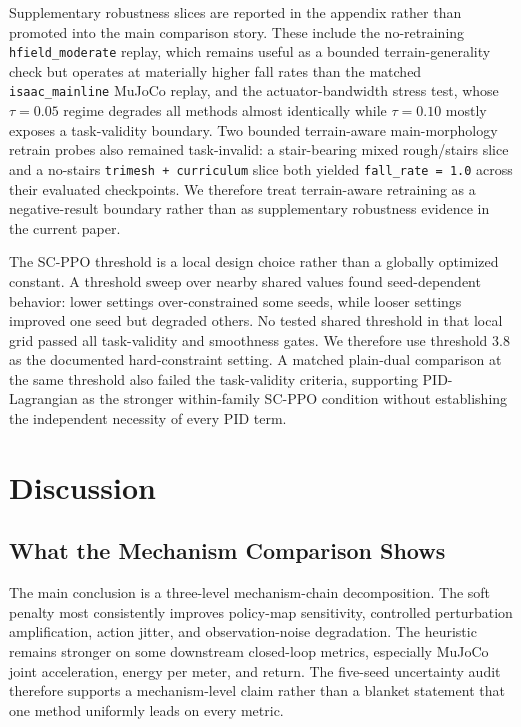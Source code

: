 \documentclass[10pt]{article}
\begin{document}
Supplementary robustness slices are reported in the appendix rather than
promoted into the main comparison story. These include the no-retraining
\texttt{hfield\_moderate} replay, which remains useful as a bounded
terrain-generality check but operates at materially higher fall rates than the
matched \texttt{isaac\_mainline} MuJoCo replay, and the actuator-bandwidth
stress test, whose $\tau=0.05$ regime degrades all methods almost
identically while $\tau=0.10$ mostly exposes a task-validity boundary. Two
bounded terrain-aware main-morphology retrain probes also remained
task-invalid: a stair-bearing mixed rough/stairs slice and a no-stairs
\texttt{trimesh + curriculum} slice both yielded \texttt{fall\_rate = 1.0}
across their evaluated checkpoints. We therefore treat terrain-aware retraining
as a negative-result boundary rather than as supplementary robustness evidence
in the current paper.

The SC-PPO threshold is a local design choice rather than a globally optimized
constant. A threshold sweep over nearby shared values found seed-dependent
behavior: lower settings over-constrained some seeds, while looser settings
improved one seed but degraded others. No tested shared threshold in that
local grid passed all task-validity and smoothness gates. We therefore use
threshold 3.8 as the documented hard-constraint setting. A matched plain-dual
comparison at the same threshold also failed the task-validity criteria,
supporting PID-Lagrangian as the stronger within-family SC-PPO condition without
establishing the independent necessity of every PID term.

\section{Discussion}

\subsection{What the Mechanism Comparison Shows}

The main conclusion is a three-level mechanism-chain decomposition. The soft
penalty most consistently improves policy-map sensitivity, controlled
perturbation amplification, action jitter, and observation-noise degradation.
The heuristic remains stronger on some downstream closed-loop metrics,
especially MuJoCo joint acceleration, energy per meter, and return. The
five-seed uncertainty audit therefore supports a mechanism-level claim rather
than a blanket statement that one method uniformly leads on every metric.
\end{document}
